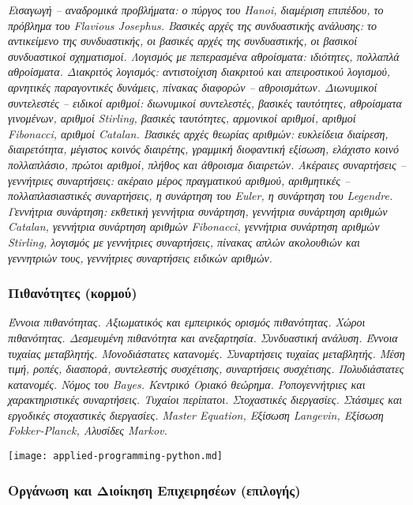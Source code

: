\emph{Εισαγωγή -- αναδρομικά προβλήματα: ο πύργος του Hanoi, διαμέριση
επιπέδου, το πρόβλημα του Flavious Josephus. Βασικές αρχές της
συνδυαστικής ανάλυσης: το αντικείμενο της συνδυαστικής, οι βασικές αρχές
της συνδυαστικής, οι βασικοί συνδυαστικοί σχηματισμοί. Λογισμός με
πεπερασμένα αθροίσματα: ιδιότητες, πολλαπλά αθροίσματα. Διακριτός
λογισμός: αντιστοίχιση διακριτού και απειροστικού λογισμού, αρνητικές
παραγοντικές δυνάμεις, πίνακας διαφορών -- αθροισμάτων. Διωνυμικοί
συντελεστές -- ειδικοί αριθμοί: διωνυμικοί συντελεστές, βασικές
ταυτότητες, αθροίσματα γινομένων, αριθμοί Stirling, βασικές ταυτότητες,
αρμονικοί αριθμοί, αριθμοί Fibonacci, αριθμοί Catalan. Βασικές αρχές
θεωρίας αριθμών: ευκλείδεια διαίρεση, διαιρετότητα, μέγιστος κοινός
διαιρέτης, γραμμική διοφαντική εξίσωση, ελάχιστο κοινό πολλαπλάσιο,
πρώτοι αριθμοί, πλήθος και άθροισμα διαιρετών. Ακέραιες συναρτήσεις --
γεννήτριες συναρτήσεις: ακέραιο μέρος πραγματικού αριθμού, αριθμητικές
-- πολλαπλασιαστικές συναρτήσεις, η συνάρτηση του Euler, η συνάρτηση του
Legendre. Γεννήτρια συνάρτηση: εκθετική γεννήτρια συνάρτηση, γεννήτρια
συνάρτηση αριθμών Catalan, γεννήτρια συνάρτηση αριθμών Fibonacci,
γεννήτρια συνάρτηση αριθμών Stirling, λογισμός με γεννήτριες
συναρτήσεις, πίνακας απλών ακολουθιών και γεννητριών τους, γεννήτριες
συναρτήσεις ειδικών αριθμών.}

\hypertarget{ux3c0ux3b9ux3b8ux3b1ux3bdux3ccux3c4ux3b7ux3c4ux3b5ux3c2-ux3baux3bfux3c1ux3bcux3bfux3cd}{%
\subsubsection{Πιθανότητες
(κορμού)}\label{ux3c0ux3b9ux3b8ux3b1ux3bdux3ccux3c4ux3b7ux3c4ux3b5ux3c2-ux3baux3bfux3c1ux3bcux3bfux3cd}}

\emph{Έννοια πιθανότητας. Αξιωματικός και εμπειρικός ορισμός
πιθανότητας. Χώροι πιθανότητας. Δεσμευμένη πιθανότητα και ανεξαρτησία.
Συνδυαστική ανάλυση. Έννοια τυχαίας μεταβλητής. Μονοδιάστατες κατανομές.
Συναρτήσεις τυχαίας μεταβλητής. Μέση τιμή, ροπές, διασπορά, συντελεστής
συσχέτισης, συναρτήσεις συσχέτισης. Πολυδιάστατες κατανομές. Νόμος του
Bayes. Κεντρικό Οριακό θεώρημα. Ροπογεννήτριες και χαρακτηριστικές
συναρτήσεις. Τυχαίοι περίπατοι. Στοχαστικές διεργασίες. Στάσιμες και
εργοδικές στοχαστικές διεργασίες. Master Equation, Εξίσωση Langevin,
Εξίσωση Fokker-Planck, Αλυσίδες Markov.}

\texttt{[image: applied-programming-python.md]}

\hypertarget{ux3bfux3c1ux3b3ux3acux3bdux3c9ux3c3ux3b7-ux3baux3b1ux3b9-ux3b4ux3b9ux3bfux3afux3baux3b7ux3c3ux3b7-ux3b5ux3c0ux3b9ux3c7ux3b5ux3b9ux3c1ux3b7ux3c3ux3adux3c9ux3bd-ux3b5ux3c0ux3b9ux3bbux3bfux3b3ux3aeux3c2}{%
\subsubsection{Οργάνωση και Διοίκηση Επιχειρησέων
(επιλογής)}\label{ux3bfux3c1ux3b3ux3acux3bdux3c9ux3c3ux3b7-ux3baux3b1ux3b9-ux3b4ux3b9ux3bfux3afux3baux3b7ux3c3ux3b7-ux3b5ux3c0ux3b9ux3c7ux3b5ux3b9ux3c1ux3b7ux3c3ux3adux3c9ux3bd-ux3b5ux3c0ux3b9ux3bbux3bfux3b3ux3aeux3c2}}

